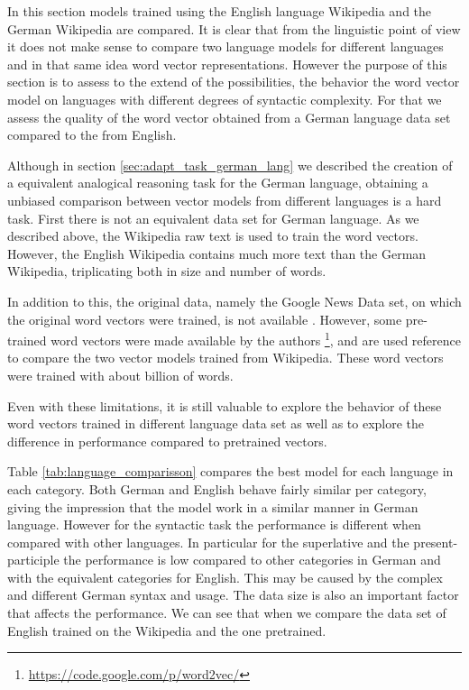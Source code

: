 In this section models trained using the English language Wikipedia and the
German Wikipedia  are compared. It is clear that from the linguistic
point of view it does not make sense to compare two language models for
different languages and in that same idea word vector representations. 
However the purpose of this section is to assess to the extend of the
possibilities, the behavior the word vector model on languages with different
degrees of syntactic complexity. For that we assess the quality of the word
vector obtained from a  German language  data set compared to the from English.

Although in section \ref{sec:adapt_task_german_lang} we described the
creation of a  equivalent analogical reasoning task for the German language,
obtaining  a unbiased comparison between vector models from different
languages is a hard task.  First there is not an equivalent data set for
German language.  As we described above, the Wikipedia raw text is used to
train the word vectors. However, the English Wikipedia contains much more
text than the German Wikipedia, triplicating both in size and  number of words.

In addition to this, the original data, namely the Google News Data set, on
which the original word vectors were trained, is not available
\cite{DBLP:journals/corr/abs-1301-3781}. However, some pre-trained word
vectors were made available by the authors \footnote{\url{https://code.google.com/p/word2vec/}}, and
are used reference to compare the two vector models trained from Wikipedia.
These word vectors were trained with about billion of words.

Even with these limitations,  it is still valuable to explore the behavior of these word
vectors trained in different language data set as well as to explore the
difference in performance compared to pretrained vectors.  

Table \ref{tab:language_comparisson} compares the best model for each language in each
category. Both German and English behave fairly similar per category, giving
the impression that the model work in a similar manner in German language.
However for the syntactic task  the performance is  different when
compared with other languages. In particular for the superlative and the
present-participle  the performance is low compared to other categories in
German and with the  equivalent categories for English. This may be caused by
the complex and different German syntax and usage. The data size is also an
important factor that affects the performance.  We can see that when we
compare the data set of English trained on the Wikipedia and the one  pretrained. 


